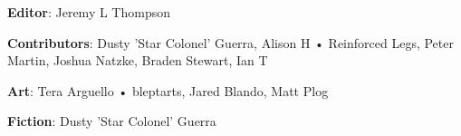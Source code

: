 \begin{description}

\item {\bfseries Editor}: Jeremy L Thompson

\item {\bfseries Contributors}: Dusty 'Star Colonel' Guerra, Alison H • Reinforced Legs, Peter Martin, Joshua Natzke, Braden Stewart, Ian T

\item {\bfseries Art}: Tera Arguello • bleptarts, Jared Blando, Matt Plog

\item {\bfseries Fiction}: Dusty 'Star Colonel' Guerra

\end{description}
